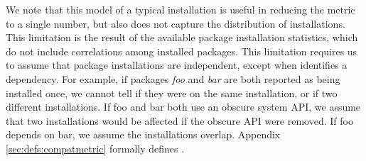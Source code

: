 \vspace{10pt}
We note that this model of a typical installation is useful in reducing the metric to a single number,
but also does not capture the distribution of installations.
This limitation is the result of the available package installation statistics,
which do not include correlations among installed packages.
This limitation requires us to 
assume that package installations are independent,
except when \osinstaller{} identifies a dependency.
For example, if packages {\em foo} and {\em bar} are both reported as being installed once,
we cannot tell if they were on the same installation, or if two different installations.
If foo and bar both use an obscure system API, we assume that two installations would be affected if the obscure API were removed.
If foo depends on bar, we assume the installations overlap. %
Appendix \ref{sec:defs:compatmetric} formally defines \compatmetric{}.



 
 

